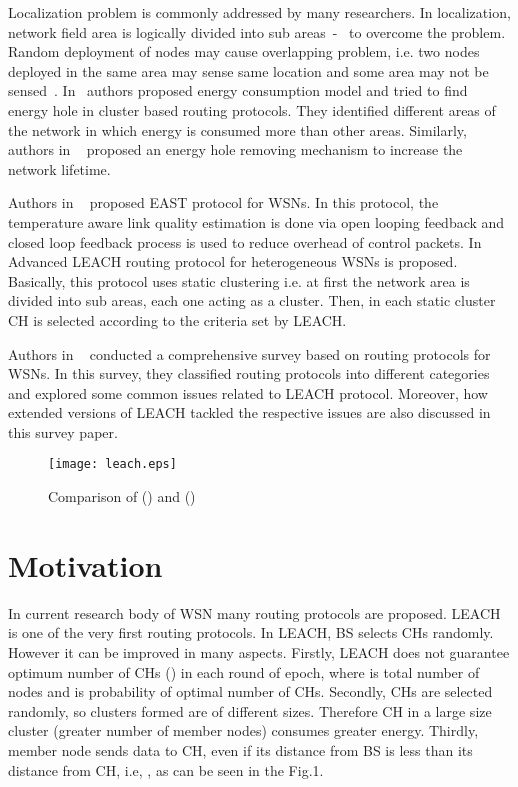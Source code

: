 \documentclass[journal]{IEEEtran}
\begin{document}
Localization problem is commonly addressed by many researchers. In localization, network ﬁeld area is logically divided into sub areas~\cite{R11}-~\cite{R12} to overcome the problem. Random deployment of nodes may cause overlapping problem, i.e. two nodes deployed in the same area may sense same location and some area may not be sensed~\cite{R13}. In~\cite{R14} authors proposed energy consumption model and tried to ﬁnd energy hole in cluster based routing protocols. They identiﬁed different areas of the network in which energy is consumed more than other areas. Similarly, authors in ~\cite{R15} proposed an energy hole removing mechanism to increase the network lifetime.

Authors in ~\cite{R16} proposed EAST protocol for WSNs. In this protocol, the temperature aware link quality estimation is done via open looping feedback and closed loop feedback process is used to reduce overhead of control packets. In ~\cite{R17} Advanced LEACH routing protocol for heterogeneous WSNs is proposed. Basically, this protocol uses static clustering i.e. at first the network area is divided into sub areas, each one acting as a cluster. Then, in each static cluster CH is selected according to the criteria set by LEACH.

Authors in ~\cite{R18} conducted a comprehensive survey based on routing protocols for WSNs. In this survey, they classified routing protocols into different categories and explored some common issues related to LEACH protocol. Moreover, how extended versions of LEACH tackled the respective issues are also discussed in this survey paper.

\begin{figure}[h]
\centering
\texttt{[image: leach.eps]}
\caption{Comparison of () and ()}
\end{figure}
\section{Motivation}
In current research body of WSN many routing protocols are proposed. LEACH is one of the very first routing protocols. In LEACH, BS selects CHs randomly. However it can be improved in many aspects. Firstly, LEACH does not guarantee optimum number of CHs () in each round of epoch, where  is total number of nodes and  is probability of optimal number of CHs. Secondly, CHs are selected randomly, so clusters formed are of different sizes. Therefore CH in a large size cluster (greater number of member nodes) consumes greater energy. Thirdly, member node sends data to CH, even if its distance from BS is less than its distance from CH, i.e, , as can be seen in the Fig.1.
\end{document}
